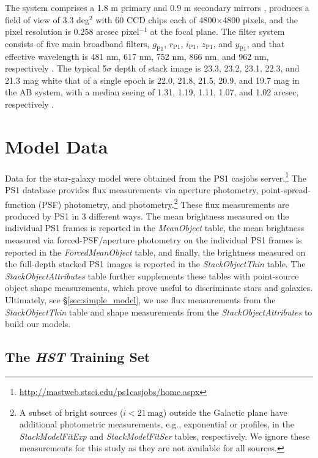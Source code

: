 \documentclass[twocolumn]{aastex62}
\begin{document}
The system comprises a 1.8 m primary and 0.9 m secondary mirrors \citep{Hodapp04}, 
produces a field of view of 3.3 deg$^2$ with 60 CCD chips each of 4800$\times$4800 pixels, 
and the pixel resolution is 0.258 arcsec pixel$^{-1}$ at the focal plane. 
The filter system consists of five main broadband filters, 
$g_{\mathrm{P1}}$, $r_{\mathrm{P1}}$, $i_{\mathrm{P1}}$, $z_{\mathrm{P1}}$, and $y_{\mathrm{P1}}$, 
and that effective wavelength is 481 nm, 617 nm, 752 nm, 866 nm, and 962 nm, 
respectively \citep{Tonry12, Schlafly12}. 
The typical 5$\sigma$ depth of stack image is 23.3, 23.2, 23.1, 22.3, and 21.3 mag 
white that of a single epoch is 22.0, 21.8, 21.5, 20.9, and 19.7 mag in the AB system, 
with a median seeing of 1.31, 1.19, 1.11, 1.07, and 1.02 arcsec, respectively \citep{Chambers16}. 
\fi


\section{Model Data}\label{sec:model_data}

Data for the star-galaxy model were obtained from the PS1 casjobs
server.\footnote{\url{http://mastweb.stsci.edu/ps1casjobs/home.aspx}} The PS1
database provides flux measurements via aperture photometry,
point-spread-function (PSF) photometry, and \citet{Kron80}
photometry.\footnote{A subset of bright sources ($i < 21\,\mathrm{mag}$)
outside the Galactic plane have additional photometric measurements, e.g.,
exponential or \citet{Sersic63} profiles, in the \textit{StackModelFitExp} and
\textit{StackModelFitSer} tables, respectively. We ignore these measurements
for this study as they are not available for all sources.} These flux
measurements are produced by PS1 in 3 different ways. The mean brightness
measured on the individual PS1 frames is reported in the \textit{MeanObject}
table, the mean brightness measured via forced-PSF/aperture photometry on the
individual PS1 frames is reported in the \textit{ForcedMeanObject} table, and
finally, the brightness measured on the full-depth stacked PS1 images is
reported in the \textit{StackObjectThin} table. The
\textit{StackObjectAttributes} table further supplements these tables with
point-source object shape measurements, which prove useful to discriminate
stars and galaxies. Ultimately, see \S\ref{sec:simple_model}, we use flux
measurements from the \textit{StackObjectThin} table and shape measurements
from the \textit{StackObjectAttributes} to build our models.

\subsection{The \textit{HST} Training Set} \label{sec:hst_train}
\end{document}
